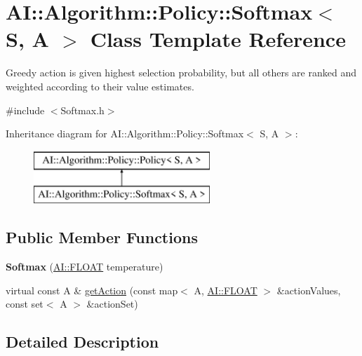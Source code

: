 \hypertarget{classAI_1_1Algorithm_1_1Policy_1_1Softmax}{\section{A\-I\-:\-:Algorithm\-:\-:Policy\-:\-:Softmax$<$ S, A $>$ Class Template Reference}
\label{classAI_1_1Algorithm_1_1Policy_1_1Softmax}
}


Greedy action is given highest selection probability, but all others are ranked and weighted according to their value estimates.  




{\ttfamily \#include $<$Softmax.\-h$>$}

Inheritance diagram for A\-I\-:\-:Algorithm\-:\-:Policy\-:\-:Softmax$<$ S, A $>$\-:\begin{figure}[H]
\begin{center}
\leavevmode
\includegraphics[height=2.000000cm]{classAI_1_1Algorithm_1_1Policy_1_1Softmax}
\end{center}
\end{figure}
\subsection*{Public Member Functions}
\begin{DoxyCompactItemize}
\item 
\hypertarget{classAI_1_1Algorithm_1_1Policy_1_1Softmax_a7f91fab0a3e3ae62fda6851f23170e9e}{{\bfseries Softmax} (\hyperlink{namespaceAI_a41b74884a20833db653dded3918e05c3}{A\-I\-::\-F\-L\-O\-A\-T} temperature)}\label{classAI_1_1Algorithm_1_1Policy_1_1Softmax_a7f91fab0a3e3ae62fda6851f23170e9e}

\item 
virtual const A \& \hyperlink{classAI_1_1Algorithm_1_1Policy_1_1Softmax_adf507bcadedab2d33e3fcc0059918d19}{get\-Action} (const map$<$ A, \hyperlink{namespaceAI_a41b74884a20833db653dded3918e05c3}{A\-I\-::\-F\-L\-O\-A\-T} $>$ \&action\-Values, const set$<$ A $>$ \&action\-Set)
\end{DoxyCompactItemize}


\subsection{Detailed Description}
